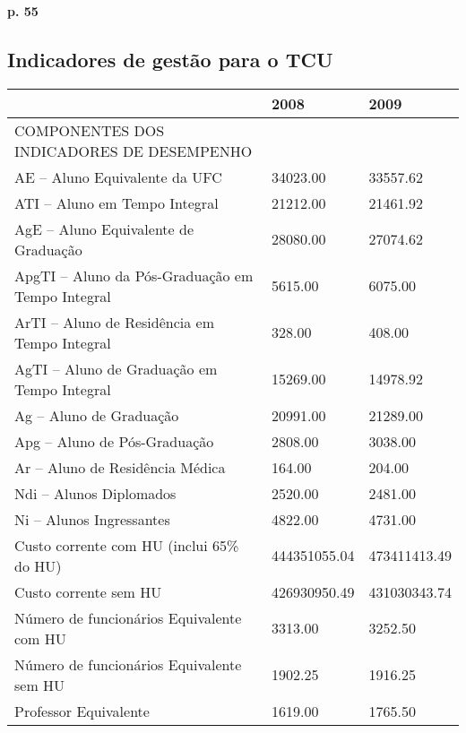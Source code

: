 \documentclass{report}
\begin{document}
\textbf{p. 55}

\subsection{Indicadores de gestão para o TCU}
\cite{indicadores_TCU}
\begin{tabular}{lll}
\toprule
{} &          2008 &          2009 \\
\midrule
COMPONENTES DOS INDICADORES DE DESEMPENHO                   &               &               \\
AE – Aluno Equivalente da UFC                             &  34023.00 &  33557.62 \\
ATI – Aluno em Tempo Integral                               &  21212.00 &  21461.92 \\
AgE – Aluno Equivalente de Graduação                        &  28080.00 &  27074.62 \\
ApgTI – Aluno da Pós-Graduação em Tempo Integral            &  5615.00 &  6075.00 \\
ArTI – Aluno de Residência em Tempo Integral                &  328.00 &  408.00 \\
AgTI – Aluno de Graduação em Tempo Integral                 &  15269.00 &  14978.92 \\
Ag – Aluno de Graduação                                     &  20991.00 &  21289.00 \\
Apg – Aluno de Pós-Graduação                                &  2808.00 &  3038.00 \\
Ar – Aluno de Residência Médica                             &  164.00 &  204.00 \\
Ndi – Alunos Diplomados                                     &  2520.00 &  2481.00 \\
Ni – Alunos Ingressantes                                    &  4822.00 &  4731.00 \\
Custo corrente com HU (inclui 65\% do HU)                   &  444351055.04 &  473411413.49 \\
Custo corrente sem HU                                       &  426930950.49 &  431030343.74 \\
Número de funcionários Equivalente com HU                   &  3313.00 &  3252.50 \\
Número de funcionários Equivalente sem HU                   &  1902.25 &  1916.25 \\
Professor Equivalente                                       &  1619.00 &  1765.50 \\

\end{tabular}
\end{document}
